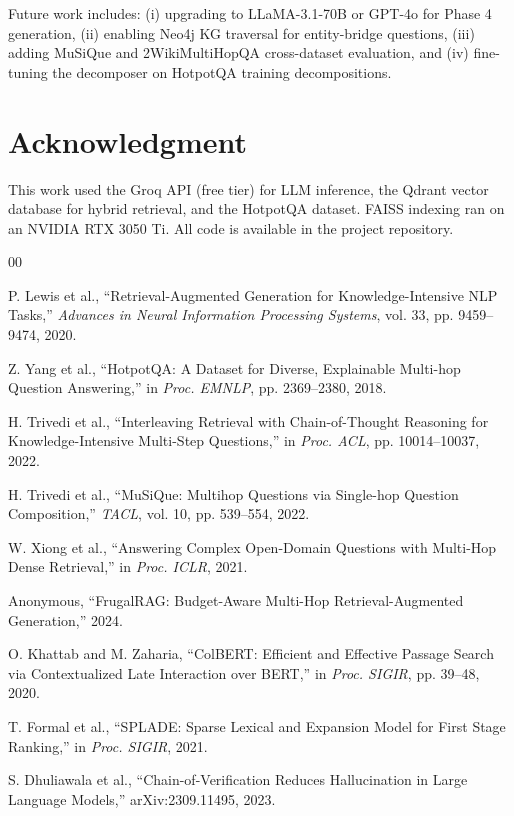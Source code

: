 \documentclass[conference]{IEEEtran}
\begin{document}
Future work includes: (i) upgrading to LLaMA-3.1-70B or GPT-4o for Phase 4 generation, (ii) enabling Neo4j KG traversal for entity-bridge questions, (iii) adding MuSiQue and 2WikiMultiHopQA cross-dataset evaluation, and (iv) fine-tuning the decomposer on HotpotQA training decompositions.

\section*{Acknowledgment}
This work used the Groq API (free tier) for LLM inference, the Qdrant vector database for hybrid retrieval, and the HotpotQA dataset. FAISS indexing ran on an NVIDIA RTX 3050 Ti. All code is available in the project repository.

\begin{thebibliography}{00}

P. Lewis et al., ``Retrieval-Augmented Generation for Knowledge-Intensive NLP Tasks,'' \textit{Advances in Neural Information Processing Systems}, vol. 33, pp. 9459--9474, 2020.

Z. Yang et al., ``HotpotQA: A Dataset for Diverse, Explainable Multi-hop Question Answering,'' in \textit{Proc. EMNLP}, pp. 2369--2380, 2018.

H. Trivedi et al., ``Interleaving Retrieval with Chain-of-Thought Reasoning for Knowledge-Intensive Multi-Step Questions,'' in \textit{Proc. ACL}, pp. 10014--10037, 2022.

H. Trivedi et al., ``MuSiQue: Multihop Questions via Single-hop Question Composition,'' \textit{TACL}, vol. 10, pp. 539--554, 2022.

W. Xiong et al., ``Answering Complex Open-Domain Questions with Multi-Hop Dense Retrieval,'' in \textit{Proc. ICLR}, 2021.

Anonymous, ``FrugalRAG: Budget-Aware Multi-Hop Retrieval-Augmented Generation,'' 2024.

O. Khattab and M. Zaharia, ``ColBERT: Efficient and Effective Passage Search via Contextualized Late Interaction over BERT,'' in \textit{Proc. SIGIR}, pp. 39--48, 2020.

T. Formal et al., ``SPLADE: Sparse Lexical and Expansion Model for First Stage Ranking,'' in \textit{Proc. SIGIR}, 2021.

S. Dhuliawala et al., ``Chain-of-Verification Reduces Hallucination in Large Language Models,'' arXiv:2309.11495, 2023.


\end{thebibliography}
\end{document}
